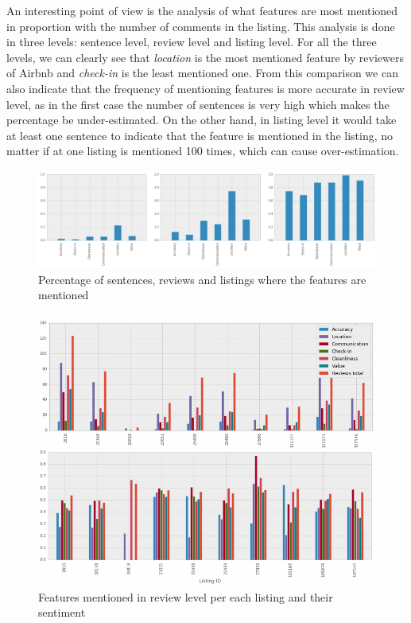 An interesting point of view is the analysis of what features are most mentioned in proportion with the number of comments in the listing. This analysis is done in three levels: sentence level, review level and listing level. For all the three levels, we can clearly see that \textit{location} is the most mentioned feature by reviewers of Airbnb and \textit{check-in} is the least mentioned one. From this comparison we can also indicate that the frequency of mentioning features is more accurate in review level, as in the first case the number of sentences is very high which makes the percentage be under-estimated. On the other hand, in listing level it would take at least one sentence to indicate that the feature is mentioned in the listing, no matter if at one listing is mentioned 100 times, which can cause over-estimation.
\begin{figure}[h!]
\centering
	\includegraphics[height=0.2\textheight]{feature_mentioned}
	\caption{Percentage of sentences, reviews and listings where the features are mentioned}
	\label{fig:fea}
\end{figure} 
\begin{figure}[h!]
	\includegraphics[height=0.57\textheight]{features_sentiment}
	\caption{Features mentioned in review level per each listing and their sentiment}
	\label{fig:feasent}
\end{figure}
